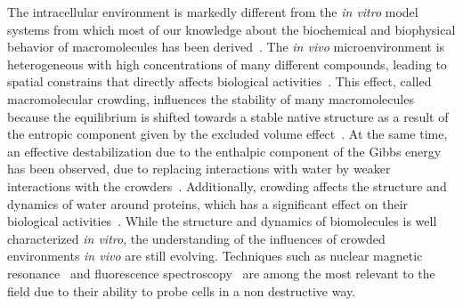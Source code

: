 \documentclass[journal=jpcisd8,manuscript=article]{achemso}
\begin{document}
The intracellular environment is markedly different from the
\textit{in vitro} model systems from which most of our knowledge about
the biochemical and biophysical behavior of macromolecules has been
derived~\cite{Feig2017a}. The \textit{in vivo} microenvironment is
heterogeneous with high concentrations of many different compounds,
leading to spatial constrains that directly affects biological
activities~\citep{ostrowska2019}. This effect, called macromolecular
crowding, influences the stability of many macromolecules
because the equilibrium is shifted towards a stable native structure
as a result of the entropic component given by the excluded volume
effect~\cite{cheung2005}. At the same time, an effective
destabilization due to the enthalpic component of the Gibbs energy has
been observed, due to replacing interactions with water by weaker
interactions with the
crowders~\cite{Feig2011,miklos2011,Wang2012b}. Additionally, crowding
affects the structure and dynamics of water around proteins, which has
a significant effect on their biological
activities~\cite{Harada2012a,king2013}.
While the structure and dynamics of biomolecules is well characterized
\textit{in vitro}, the understanding of the influences of crowded
environments \textit{in vivo} are still evolving.  Techniques such as
nuclear magnetic resonance~\cite{reckel2007,pielak2008} and
fluorescence spectroscopy~\cite{ignatova2004,xie2008,English2011} are
among the most relevant to the field due to their ability to probe
cells in a non destructive way. 
\end{document}
